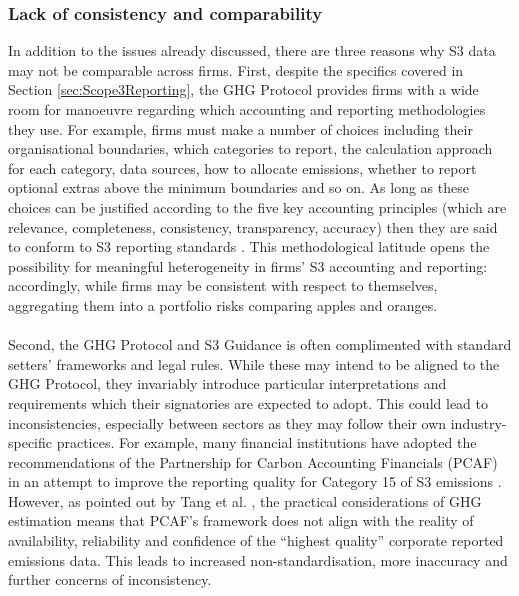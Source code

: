 \documentclass[12pt,twoside]{report}
\begin{document}
\subsubsection{Lack of consistency and comparability}
In addition to the issues already discussed, there are three reasons why S3 data may not be comparable across firms. First, despite the specifics covered in Section \ref{sec:Scope3Reporting}, the GHG Protocol provides firms with a wide room for manoeuvre regarding which accounting and reporting methodologies they use. For example, firms must make a number of choices including their organisational boundaries, which categories to report, the calculation approach for each category, data sources, how to allocate emissions, whether to report optional extras above the minimum boundaries and so on. As long as these choices can be justified according to the five key accounting principles (which are relevance, completeness, consistency, transparency, accuracy) then they are said to conform to S3 reporting standards \cite{ghgscope32013}. This methodological latitude opens the possibility for meaningful heterogeneity in firms' S3 accounting and reporting: accordingly, while firms may be consistent with respect to themselves, aggregating them into a portfolio risks comparing apples and oranges. 
\\ \\
Second, the GHG Protocol and S3 Guidance is often complimented with standard setters' frameworks and legal rules. While these may intend to be aligned to the GHG Protocol, they invariably introduce particular interpretations and requirements which their signatories are expected to adopt. This could lead to inconsistencies, especially between sectors as they may follow their own industry-specific practices. For example, many financial institutions have adopted the recommendations of the Partnership for Carbon Accounting Financials (PCAF) in an attempt to improve the reporting quality for Category 15 of S3 emissions \cite{PCAF2022}. However, as pointed out by Tang et al. \cite{Tang2023}, the practical considerations of GHG estimation means that PCAF's framework does not align with the reality of availability, reliability and confidence of the ``highest quality'' corporate reported emissions data. This leads to increased non-standardisation, more inaccuracy and further concerns of inconsistency. 
\\ \\
\end{document}
